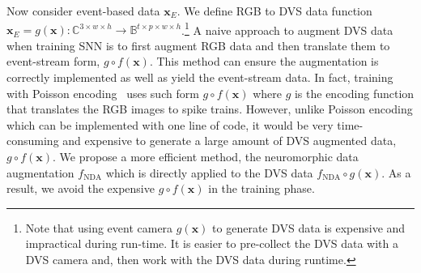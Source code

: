 \documentclass[runningheads]{llncs}
\begin{document}
Now consider event-based data $\bm{x}_E$. We define RGB to DVS data function $\bm{x}_E =g(\bm{x}):\mathbb{C}^{3\times w\times h}\rightarrow \mathbb{B}^{t\times p\times w\times h}$.\footnote{Note that using event camera $g(\bm{x})$ to generate DVS data is expensive and impractical during run-time. It is easier to pre-collect the DVS data with a DVS camera and, then work with the DVS data during runtime.}
A naive approach to augment DVS data when training SNN is to first augment RGB data and then translate them to event-stream form, \ie $g\circ f(\bm{x})$.
This method can ensure the augmentation is correctly implemented as well as yield the event-stream data. In fact, training with Poisson encoding~\cite{diehl2015fast,roy2019towards} uses such form $g\circ f(\bm{x})$ where $g$ is the encoding function that translates the RGB images to spike trains.
However, unlike Poisson encoding which can be implemented with one line of code, it would be very time-consuming and expensive to generate a large amount of DVS augmented data, \ie $g\circ f(\bm{x})$. We propose a more efficient method, the neuromorphic data augmentation $f_{\text{NDA}}$ which is directly applied to the DVS data $f_{\text{NDA}}\circ g(\bm{x})$. As a result, we avoid the expensive $g\circ f(\bm{x})$ in the training phase.
\end{document}

